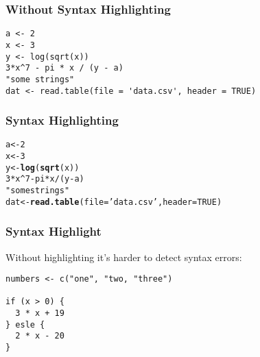 \documentclass[12pt]{beamer}\usepackage[]{graphicx}\usepackage[]{color}
\makeatletter
\newcommand{\hlnum}[1]{\textcolor[rgb]{0.686,0.059,0.569}{#1}}%
\newcommand{\hlstr}[1]{\textcolor[rgb]{0.192,0.494,0.8}{#1}}%
\newcommand{\hlopt}[1]{\textcolor[rgb]{0,0,0}{#1}}%
\newcommand{\hlstd}[1]{\textcolor[rgb]{0.345,0.345,0.345}{#1}}%
\newcommand{\hlkwb}[1]{\textcolor[rgb]{0.69,0.353,0.396}{#1}}%
\newcommand{\hlkwc}[1]{\textcolor[rgb]{0.333,0.667,0.333}{#1}}%
\newcommand{\hlkwd}[1]{\textcolor[rgb]{0.737,0.353,0.396}{\textbf{#1}}}%
\newenvironment{kframe}{%
 \def\at@end@of@kframe{}%
 \ifinner\ifhmode%
  \def\at@end@of@kframe{\end{minipage}}%
  \begin{minipage}{\columnwidth}%
 \fi\fi%
 \def\FrameCommand##1{\hskip\@totalleftmargin \hskip-\fboxsep
 \colorbox{shadecolor}{##1}\hskip-\fboxsep
     \hskip-\linewidth \hskip-\@totalleftmargin \hskip\columnwidth}%
 \MakeFramed {\advance\hsize-\width
   \@totalleftmargin\z@ \linewidth\hsize
   \@setminipage}}%
 {\par\unskip\endMakeFramed%
 \at@end@of@kframe}
\newenvironment{knitrout}{}{} %
\makeatother
\begin{document}

\begin{frame}[fragile]
\frametitle{Without Syntax Highlighting}

\begin{verbatim}
a <- 2
x <- 3
y <- log(sqrt(x))
3*x^7 - pi * x / (y - a)
"some strings"
dat <- read.table(file = 'data.csv', header = TRUE)
\end{verbatim}

\end{frame}


\begin{frame}[fragile]
\frametitle{Syntax Highlighting}

\begin{knitrout}
\color{fgcolor}\begin{kframe}
\begin{alltt}
\hlstd{a} \hlkwb{<-} \hlnum{2}
\hlstd{x} \hlkwb{<-} \hlnum{3}
\hlstd{y} \hlkwb{<-} \hlkwd{log}\hlstd{(}\hlkwd{sqrt}\hlstd{(x))}
\hlnum{3}\hlopt{*}\hlstd{x}\hlopt{^}\hlnum{7} \hlopt{-} \hlstd{pi} \hlopt{*} \hlstd{x} \hlopt{/} \hlstd{(y} \hlopt{-} \hlstd{a)}
\hlstr{"some strings"}
\hlstd{dat} \hlkwb{<-} \hlkwd{read.table}\hlstd{(}\hlkwc{file} \hlstd{=} \hlstr{'data.csv'}\hlstd{,} \hlkwc{header} \hlstd{=} \hlnum{TRUE}\hlstd{)}
\end{alltt}
\end{kframe}
\end{knitrout}

\end{frame}


\begin{frame}[fragile]
\frametitle{Syntax Highlight}

{\mdlit Without highlighting it's harder to detect syntax errors:}
\begin{verbatim}
numbers <- c("one", "two, "three")

if (x > 0) {
  3 * x + 19
} esle {
  2 * x - 20
}
\end{verbatim}

\end{frame}

\end{document}

